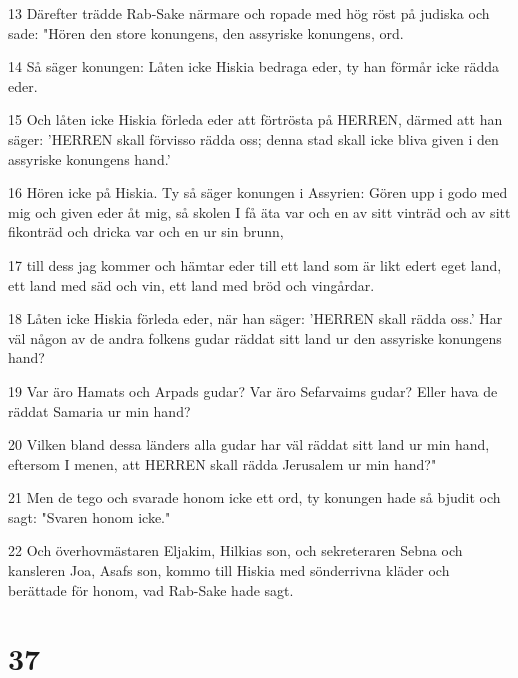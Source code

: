 \par 13 Därefter trädde Rab-Sake närmare och ropade med hög röst på judiska och sade: "Hören den store konungens, den assyriske konungens, ord.
\par 14 Så säger konungen: Låten icke Hiskia bedraga eder, ty han förmår icke rädda eder.
\par 15 Och låten icke Hiskia förleda eder att förtrösta på HERREN, därmed att han säger: 'HERREN skall förvisso rädda oss; denna stad skall icke bliva given i den assyriske konungens hand.'
\par 16 Hören icke på Hiskia. Ty så säger konungen i Assyrien: Gören upp i godo med mig och given eder åt mig, så skolen I få äta var och en av sitt vinträd och av sitt fikonträd och dricka var och en ur sin brunn,
\par 17 till dess jag kommer och hämtar eder till ett land som är likt edert eget land, ett land med säd och vin, ett land med bröd och vingårdar.
\par 18 Låten icke Hiskia förleda eder, när han säger: 'HERREN skall rädda oss.' Har väl någon av de andra folkens gudar räddat sitt land ur den assyriske konungens hand?
\par 19 Var äro Hamats och Arpads gudar? Var äro Sefarvaims gudar? Eller hava de räddat Samaria ur min hand?
\par 20 Vilken bland dessa länders alla gudar har väl räddat sitt land ur min hand, eftersom I menen, att HERREN skall rädda Jerusalem ur min hand?"
\par 21 Men de tego och svarade honom icke ett ord, ty konungen hade så bjudit och sagt: "Svaren honom icke."
\par 22 Och överhovmästaren Eljakim, Hilkias son, och sekreteraren Sebna och kansleren Joa, Asafs son, kommo till Hiskia med sönderrivna kläder och berättade för honom, vad Rab-Sake hade sagt.

\chapter{37}

